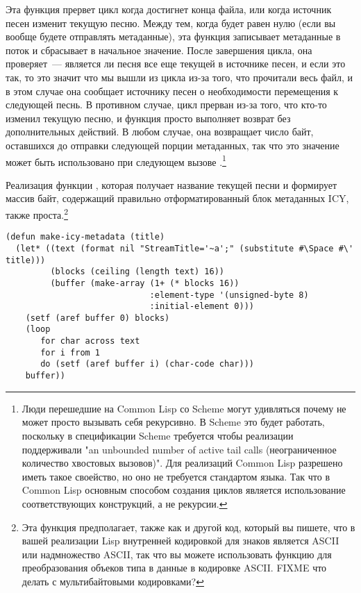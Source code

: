 Эта функция прервет цикл когда достигнет конца файла, или когда источник песен изменит
текущую песню.  Между тем, когда  будет равен нулю (если вы вообще
будете отправлять метаданные), эта функция записывает метаданные в поток и сбрасывает
 в начальное значение.  После завершения цикла, она проверяет~---
является ли песня все еще текущей в источнике песен, и если это так, то это значит что мы
вышли из цикла из-за того, что прочитали весь файл, и в этом случае она сообщает источнику
песен о необходимости перемещения к следующей песнь.  В противном случае, цикл прерван
из-за того, что кто-то изменил текущую песню, и функция просто выполняет возврат без
дополнительных действий.  В любом случае, она возвращает число байт, оставшихся до
отправки следующей порции метаданных, так что это значение может быть использовано при
следующем вызове .\footnote{Люди перешедшие на Common Lisp со Scheme
  могут удивляться почему  не может просто вызывать себя рекурсивно.  В
  Scheme это будет работать, поскольку в спецификации Scheme требуется чтобы реализации
  поддерживали "an unbounded number of active tail calls (неограниченное количество
  хвостовых вызовов)".  Для реализаций Common Lisp разрешено иметь такое своейство, но оно
  не требуется стандартом языка.  Так что в Common Lisp основным способом создания циклов
  является использование соответствующих конструкций, а не рекурсии.}

Реализация функции , которая получает название текущей песни и
формирует массив байт, содержащий правильно отформатированный блок метаданных ICY, также
проста.\footnote{Эта функция предполагает, также как и другой код, который вы пишете, что
  в вашей реализации Lisp внутренней кодировкой для знаков является ASCII или надмножество
  ASCII, так что вы можете использовать функцию  для преобразования
  объеков типа  в данные в кодировке ASCII. FIXME что делать с
  мультибайтовыми кодировками?}

\begin{lstlisting}
(defun make-icy-metadata (title)
  (let* ((text (format nil "StreamTitle='~a';" (substitute #\Space #\' title)))
         (blocks (ceiling (length text) 16))
         (buffer (make-array (1+ (* blocks 16))
                             :element-type '(unsigned-byte 8)
                             :initial-element 0)))
    (setf (aref buffer 0) blocks)
    (loop 
       for char across text
       for i from 1 
       do (setf (aref buffer i) (char-code char)))
    buffer))
\end{lstlisting}

